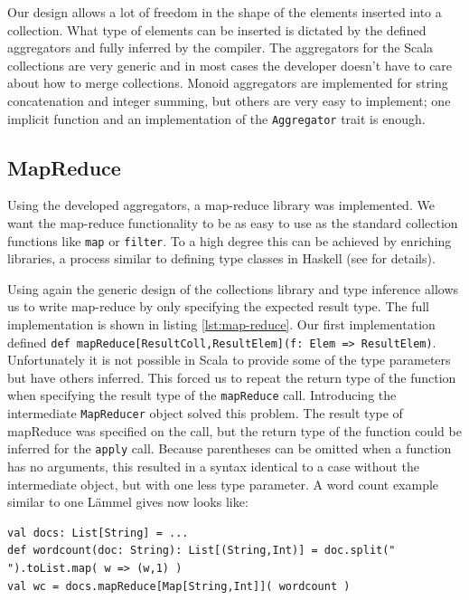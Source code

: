 \documentclass[10pt,a4paper]{article}
\begin{document}
Our design allows a lot of freedom in the shape of the elements inserted into a collection. What type of elements can be inserted is dictated by the defined aggregators and fully inferred by the compiler. The aggregators for the Scala collections are very generic and in most cases the developer doesn't have to care about how to merge collections. Monoid aggregators are implemented for string concatenation and integer summing, but others are very easy to implement; one implicit function and an implementation of the \lstinline|Aggregator| trait is enough.

\subsection{MapReduce}

Using the developed aggregators, a map-reduce library was implemented. We want the map-reduce functionality to be as easy to use as the standard collection functions like \lstinline|map| or \lstinline|filter|. To a high degree this can be achieved by enriching libraries, a process similar to defining type classes in Haskell (see \cite{odersky2006pimp} for details).

Using again the generic design of the collections library and type inference allows us to write map-reduce by only specifying the expected result type. The full implementation is shown in listing \ref{lst:map-reduce}. Our first implementation defined \lstinline|def mapReduce[ResultColl,ResultElem](f: Elem => ResultElem)|. Unfortunately it is not possible in Scala to provide some of the type parameters but have others inferred. This forced us to repeat the return type of the function when specifying the result type of the \lstinline|mapReduce| call. Introducing the intermediate \lstinline|MapReducer| object solved this problem. The result type of mapReduce was specified on the call, but the return type of the function could be inferred for the \lstinline|apply| call. Because parentheses can be omitted when a function has no arguments, this resulted in a syntax identical to a case without the intermediate object, but with one less type parameter. A word count example similar to one L\"ammel gives now looks like:
\begin{lstlisting}
val docs: List[String] = ...
def wordcount(doc: String): List[(String,Int)] = doc.split(" ").toList.map( w => (w,1) )
val wc = docs.mapReduce[Map[String,Int]]( wordcount )
\end{lstlisting}
\end{document}

